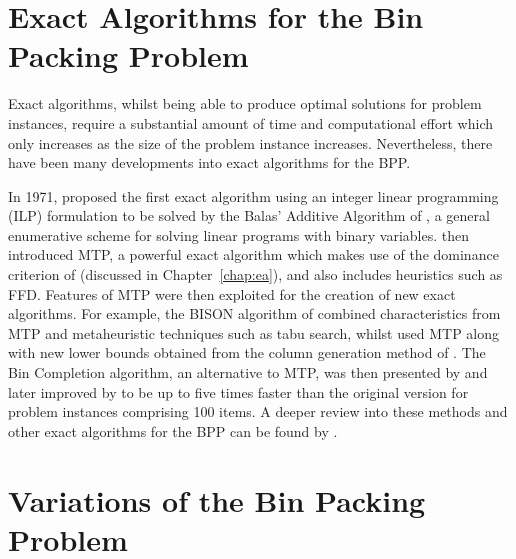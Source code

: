 \documentclass[a4paper,11pt]{article}
\begin{document}


\section{Exact Algorithms for the Bin Packing Problem}
\label{sec:exactbpp}

\noindent Exact algorithms, whilst being able to produce optimal solutions for problem instances, require a substantial amount of time and computational effort which only increases as the size of the problem instance increases. Nevertheless, there have been many developments into exact algorithms for the BPP. 

In 1971, \citeauthor{eilon1971} proposed the first exact algorithm using an integer linear programming (ILP) formulation to be solved by the Balas' Additive Algorithm of \citet{balas1965}, a general enumerative scheme for solving linear programs with binary variables. \citet{martello1990k} then introduced MTP, a powerful exact algorithm which makes use of the dominance criterion of \citet{martello1990l} (discussed in Chapter~\ref{chap:ea}), and also includes heuristics such as FFD. Features of MTP were then exploited for the creation of new exact algorithms. For example, the BISON algorithm of \citet{scholl1997} combined characteristics from MTP and metaheuristic techniques such as tabu search, whilst \citet{schwerin1999} used MTP along with new lower bounds obtained from the column generation method of \citet{gilmore1961, gilmore1963}. The Bin Completion algorithm, an alternative to MTP, was then presented by \citet{korf2002, korf2003} and later improved by \citet{schreiber2013} to be up to five times faster than the original version for problem instances comprising 100 items. A deeper review into these methods and other exact algorithms for the BPP can be found by \citet{delorme2016}.


\section{Variations of the Bin Packing Problem}
\label{sec:variationsbpp}
\end{document}
